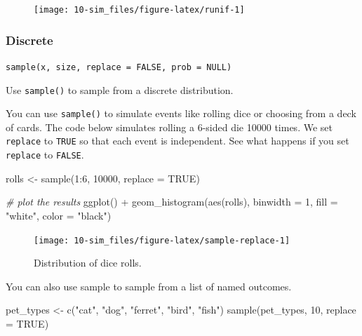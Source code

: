 \documentclass[
  oneside]{book}
\newenvironment{Shaded}{\begin{snugshade}}{\end{snugshade}}
\newcommand{\AttributeTok}[1]{\textcolor[rgb]{0.77,0.63,0.00}{#1}}
\newcommand{\CommentTok}[1]{\textcolor[rgb]{0.56,0.35,0.01}{\textit{#1}}}
\newcommand{\ConstantTok}[1]{\textcolor[rgb]{0.00,0.00,0.00}{#1}}
\newcommand{\DecValTok}[1]{\textcolor[rgb]{0.00,0.00,0.81}{#1}}
\newcommand{\FunctionTok}[1]{\textcolor[rgb]{0.00,0.00,0.00}{#1}}
\newcommand{\NormalTok}[1]{#1}
\newcommand{\OtherTok}[1]{\textcolor[rgb]{0.56,0.35,0.01}{#1}}
\newcommand{\SpecialCharTok}[1]{\textcolor[rgb]{0.00,0.00,0.00}{#1}}
\newcommand{\StringTok}[1]{\textcolor[rgb]{0.31,0.60,0.02}{#1}}
\begin{document}
\begin{figure}

{\centering \texttt{[image: 10-sim\_files/figure-latex/runif-1]} 

}

\end{figure}

\hypertarget{discrete}{%
\subsubsection{Discrete}\label{discrete}}

\texttt{sample(x,\ size,\ replace\ =\ FALSE,\ prob\ =\ NULL)}

Use \texttt{sample()} to sample from a discrete distribution.

You can use \texttt{sample()} to simulate events like rolling dice or choosing from a deck of cards. The code below simulates rolling a 6-sided die 10000 times. We set \texttt{replace} to \texttt{TRUE} so that each event is independent. See what happens if you set \texttt{replace} to \texttt{FALSE}.

\begin{Shaded}
\begin{Highlighting}[]
\NormalTok{rolls }\OtherTok{\textless{}{-}} \FunctionTok{sample}\NormalTok{(}\DecValTok{1}\SpecialCharTok{:}\DecValTok{6}\NormalTok{, }\DecValTok{10000}\NormalTok{, }\AttributeTok{replace =} \ConstantTok{TRUE}\NormalTok{)}

\CommentTok{\# plot the results}
\FunctionTok{ggplot}\NormalTok{() }\SpecialCharTok{+} 
  \FunctionTok{geom\_histogram}\NormalTok{(}\FunctionTok{aes}\NormalTok{(rolls), }\AttributeTok{binwidth =} \DecValTok{1}\NormalTok{, }
                 \AttributeTok{fill =} \StringTok{"white"}\NormalTok{, }\AttributeTok{color =} \StringTok{"black"}\NormalTok{)}
\end{Highlighting}
\end{Shaded}

\begin{figure}

{\centering \texttt{[image: 10-sim\_files/figure-latex/sample-replace-1]} 

}

\caption{Distribution of dice rolls.}\label{fig:sample-replace}
\end{figure}

You can also use sample to sample from a list of named outcomes.

\begin{Shaded}
\begin{Highlighting}[]
\NormalTok{pet\_types }\OtherTok{\textless{}{-}} \FunctionTok{c}\NormalTok{(}\StringTok{"cat"}\NormalTok{, }\StringTok{"dog"}\NormalTok{, }\StringTok{"ferret"}\NormalTok{, }\StringTok{"bird"}\NormalTok{, }\StringTok{"fish"}\NormalTok{)}
\FunctionTok{sample}\NormalTok{(pet\_types, }\DecValTok{10}\NormalTok{, }\AttributeTok{replace =} \ConstantTok{TRUE}\NormalTok{)}
\end{Highlighting}
\end{Shaded}
\end{document}
